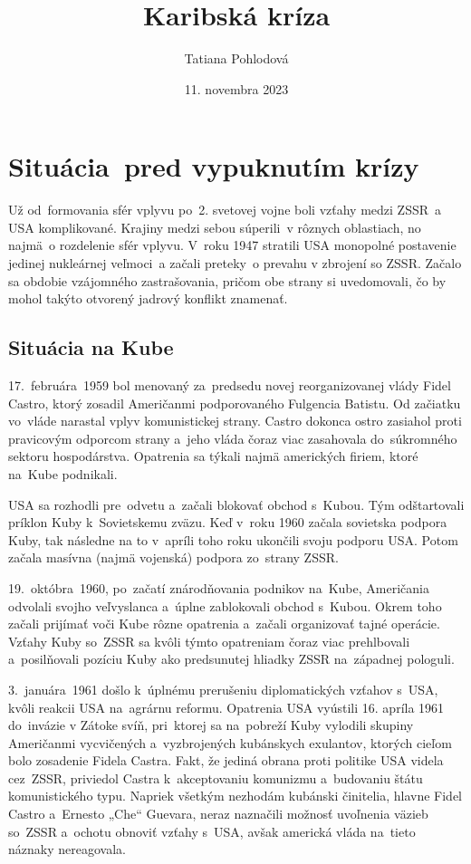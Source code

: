 \documentclass[a4paper]{article}
\title{Karibská kríza}
\author{Tatiana Pohlodová}
\date{11. novembra 2023}
\begin{document}
\maketitle

\section{Situácia~pred vypuknutím krízy}
Už od~formovania sfér vplyvu po~2. svetovej vojne boli vzťahy medzi ZSSR~a USA komplikované. Krajiny medzi sebou súperili~v rôznych oblastiach, no najmä~o rozdelenie sfér vplyvu. V~roku 1947 stratili USA monopolné postavenie jedinej nukleárnej veľmoci~a začali 
preteky~o prevahu v zbrojení so ZSSR. Začalo sa obdobie vzájomného zastrašovania, pričom obe strany si uvedomovali, čo by mohol takýto otvorený jadrový konflikt znamenať.

\subsection{Situácia na Kube}
17.~februára~1959 bol menovaný za~predsedu novej reorganizovanej vlády Fidel Castro, ktorý zosadil Američanmi podporovaného Fulgencia Batistu. Od začiatku vo~vláde narastal vplyv komunistickej strany. Castro dokonca ostro zasiahol proti pravicovým odporcom strany a~jeho vláda čoraz viac zasahovala do~súkromného sektoru hospodárstva. Opatrenia sa týkali najmä amerických firiem, ktoré na~Kube podnikali.

USA sa rozhodli pre~odvetu a~začali blokovať obchod s~Kubou. Tým odštartovali príklon Kuby k~Sovietskemu zväzu. Keď v~roku 1960 začala sovietska podpora Kuby, tak následne na to v~apríli toho roku ukončili svoju podporu USA. Potom začala masívna (najmä vojenská) podpora zo~strany ZSSR.

19.~októbra~1960, po~začatí znárodňovania podnikov na~Kube, Američania odvolali svojho veľvyslanca a~úplne zablokovali obchod s~Kubou. Okrem toho začali prijímať voči Kube rôzne opatrenia a~začali organizovať tajné operácie. Vzťahy Kuby so~ZSSR sa kvôli týmto opatreniam čoraz viac prehlbovali a~posilňovali pozíciu Kuby ako predsunutej hliadky ZSSR na~západnej pologuli.

3.~januára~1961 došlo k~úplnému prerušeniu diplomatických vzťahov s~USA, kvôli reakcii USA na~agrárnu reformu. Opatrenia USA vyústili 16. apríla 1961 do~invázie v Zátoke svíň, pri~ktorej sa na~pobreží Kuby vylodili skupiny Američanmi vycvičených a~vyzbrojených kubánskych exulantov, ktorých cieľom bolo zosadenie Fidela Castra. Fakt, že jediná obrana proti politike USA videla cez~ZSSR, priviedol Castra k~akceptovaniu komunizmu a~budovaniu štátu komunistického typu. Napriek všetkým nezhodám kubánski činitelia, hlavne Fidel Castro a~Ernesto „Che“ Guevara, neraz naznačili možnosť uvoľnenia väzieb so~ZSSR a~ochotu obnoviť vzťahy s~USA, avšak americká vláda na~tieto náznaky nereagovala.
\end{document}
